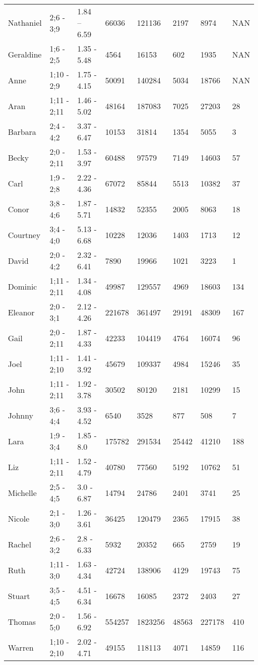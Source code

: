 \begin{table}[]
\begin{tabular}{llllllll}
Nathaniel & 2;6 - 3;9 & 1.84 – 6.59 & 66036 & 121136 & 2197 & 8974 & NAN \\
Geraldine & 1;6 - 2;5 & 1.35 - 5.48 & 4564 & 16153 & 602 & 1935 & NAN \\
Anne & 1;10 - 2;9 & 1.75 - 4.15 & 50091 & 140284 & 5034 & 18766 & NAN \\
Aran & 1;11 - 2;11 & 1.46 - 5.02 & 48164 & 187083 & 7025 & 27203 & 28 \\
Barbara & 2;4 - 4;2 & 3.37 - 6.47 & 10153 & 31814 & 1354 & 5055 & 3 \\
Becky & 2;0 - 2;11 & 1.53 - 3.97 & 60488 & 97579 & 7149 & 14603 & 57 \\
Carl & 1;9 - 2;8 & 2.22 - 4.36 & 67072 & 85844 & 5513 & 10382 & 37 \\
Conor & 3;8 - 4;6 & 1.87 - 5.71 & 14832 & 52355 & 2005 & 8063 & 18 \\
Courtney & 3;4 - 4;0 & 5.13 - 6.68 & 10228 & 12036 & 1403 & 1713 & 12 \\
David & 2;0 - 4;2 & 2.32 - 6.41 & 7890 & 19966 & 1021 & 3223 & 1 \\
Dominic & 1;11 - 2;11 & 1.34 - 4.08 & 49987 & 129557 & 4969 & 18603 & 134 \\
Eleanor & 2;0 - 3;1 & 2.12 - 4.26 & 221678 & 361497 & 29191 & 48309 & 167 \\
Gail & 2;0 - 2;11 & 1.87 - 4.33 & 42233 & 104419 & 4764 & 16074 & 96 \\
Joel & 1;11 - 2;10 & 1.41 - 3.92 & 45679 & 109337 & 4984 & 15246 & 35 \\
John & 1;11 - 2;11 & 1.92 - 3.78 & 30502 & 80120 & 2181 & 10299 & 15 \\
Johnny & 3;6 - 4;4 & 3.93 - 4.52 & 6540 & 3528 & 877 & 508 & 7 \\
Lara & 1;9 - 3;4 & 1.85 - 8.0 & 175782 & 291534 & 25442 & 41210 & 188 \\
Liz & 1;11 - 2;11 & 1.52 - 4.79 & 40780 & 77560 & 5192 & 10762 & 51 \\
Michelle & 2;5 - 4;5 & 3.0 - 6.87 & 14794 & 24786 & 2401 & 3741 & 25 \\
Nicole & 2;1 - 3;0 & 1.26 - 3.61 & 36425 & 120479 & 2365 & 17915 & 38 \\
Rachel & 2;6 - 3;2 & 2.8 - 6.33 & 5932 & 20352 & 665 & 2759 & 19 \\
Ruth & 1;11 - 3;0 & 1.63 - 4.34 & 42724 & 138906 & 4129 & 19743 & 75 \\
Stuart & 3;5 - 4;5 & 4.51 - 6.34 & 16678 & 16085 & 2372 & 2403 & 27 \\
Thomas & 2;0 - 5;0 & 1.56 - 6.92 & 554257 & 1823256 & 48563 & 227178 & 410 \\
Warren & 1;10 - 2;10 & 2.02 - 4.71 & 49155 & 118113 & 4071 & 14859 & 116
\end{tabular}
\end{table}
